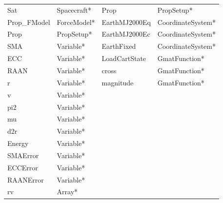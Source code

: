 \begin{center}
\tablelasttail{\hline}
\begin{supertabular}{|p{1.4in}p{1.4in}|p{1.4in}p{1.4in}|}
Sat & Spacecraft* & Prop & PropSetup* \\
Prop\_FModel & ForceModel* & EarthMJ2000Eq & CoordinateSystem* \\
Prop & PropSetup* & EarthMJ2000Ec & CoordinateSystem*\\
SMA & Variable* & EarthFixed & CoordinateSystem*\\
ECC & Variable* & LoadCartState & GmatFunction*\\
RAAN & Variable* & cross & GmatFunction*\\
r & Variable* & magnitude & GmatFunction*\\
v & Variable* & & \\
pi2 & Variable* & & \\
mu & Variable* & & \\
d2r & Variable* & & \\
Energy & Variable* & & \\
SMAError & Variable* & & \\
ECCError & Variable* & & \\
RAANError & Variable* & & \\
rv & Array* & & \\

\end{supertabular}
\end{center}
